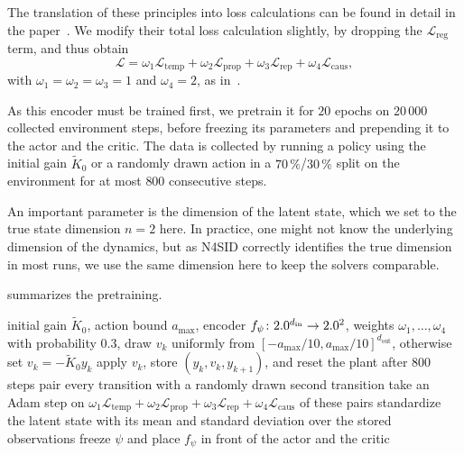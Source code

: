 The translation of these principles into loss calculations can be found in detail in the
paper~\cite[Sec.~IV-B]{Botteghi2021LowDimensional}. We modify their total loss calculation slightly,
by dropping the $\mathcal{L}_{\mathrm{reg}}$ term, and thus obtain
\begin{equation}
    \label{eq:prior-loss}
    \mathcal{L} = \omega_1 \mathcal{L}_{\mathrm{temp}} + \omega_2 \mathcal{L}_{\mathrm{prop}} + \omega_3 \mathcal{L}_{\mathrm{rep}}
        + \omega_4 \mathcal{L}_{\mathrm{caus}} ,
\end{equation}
with $\omega_1 = \omega_2 = \omega_3 = 1$ and $\omega_4 = 2$, as in~\cite[Eq.~(9)]{Botteghi2021LowDimensional}.

As this encoder must be trained first, we pretrain it for $20$ epochs on $20\,000$
collected environment steps, before freezing its parameters and prepending
it to the actor and the critic. The data is collected by running a policy using
the initial gain $\tilde{K}_0$ or a randomly drawn action in a $70\,\%$/$30\,\%$ split on
the environment for at most $800$ consecutive steps.

An important parameter is the dimension of the latent state, which we set to the true state dimension $n = 2$ here.
In practice, one might not know the underlying dimension of the dynamics, but as N4SID correctly identifies
the true dimension in most runs, we use the same dimension here to keep the solvers comparable.

 summarizes the pretraining.
\begin{algorithm}[htbp]
    \caption{Pretraining of the scalable encoder}
    \label{alg:encoder-pretraining}
    \begin{algorithmic}[1]
        \REQUIRE initial gain $\tilde{K}_0$, action bound $a_{\max}$, encoder $f_\psi \colon 2.0^{d_{\mathrm{in}}} \to 2.0^{2}$,
        weights $\omega_1, \dots, \omega_4$
            \STATE with probability $0.3$, draw $v_k$ uniformly from $[-a_{\max}/10, a_{\max}/10]^{d_{\mathrm{out}}}$,
            otherwise set $v_k = -\tilde{K}_0 y_k$
            \STATE apply $v_k$, store $(y_k, v_k, y_{k+1})$, and reset the plant after $800$ steps
        \ENDFOR
                \STATE pair every transition with a randomly drawn second transition
                \STATE take an Adam step on $\omega_1 \mathcal{L}_{\mathrm{temp}} + \omega_2 \mathcal{L}_{\mathrm{prop}}
                + \omega_3 \mathcal{L}_{\mathrm{rep}} + \omega_4 \mathcal{L}_{\mathrm{caus}}$ of these pairs
            \ENDFOR
        \ENDFOR
        \STATE standardize the latent state with its mean and standard deviation over the stored observations
        \STATE freeze $\psi$ and place $f_\psi$ in front of the actor and the critic
    \end{algorithmic}
\end{algorithm}

